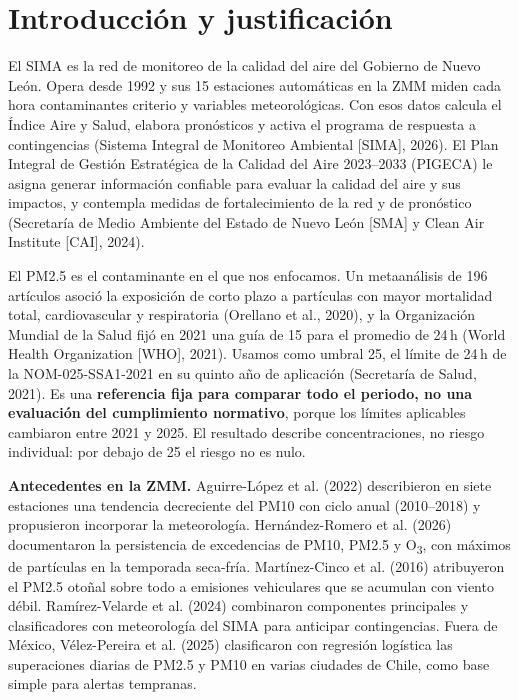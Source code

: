 \section{Introducción y justificación}\label{sec:intro}

El SIMA es la red de monitoreo de la calidad del aire del Gobierno de Nuevo León. Opera desde 1992 y sus 15 estaciones automáticas en la ZMM miden cada hora contaminantes criterio y variables meteorológicas. Con esos datos calcula el Índice Aire y Salud, elabora pronósticos y activa el programa de respuesta a contingencias (Sistema Integral de Monitoreo Ambiental [SIMA], 2026). El Plan Integral de Gestión Estratégica de la Calidad del Aire 2023–2033 (PIGECA) le asigna generar información confiable para evaluar la calidad del aire y sus impactos, y contempla medidas de fortalecimiento de la red y de pronóstico (Secretaría de Medio Ambiente del Estado de Nuevo León [SMA] y Clean Air Institute [CAI], 2024).

El PM2.5 es el contaminante en el que nos enfocamos. Un metaanálisis de 196 artículos asoció la exposición de corto plazo a partículas con mayor mortalidad total, cardiovascular y respiratoria (Orellano et al., 2020), y la Organización Mundial de la Salud fijó en 2021 una guía de 15\ugm{} para el promedio de 24\,h (World Health Organization [WHO], 2021). Usamos como umbral 25\ugm, el límite de 24\,h de la NOM-025-SSA1-2021 en su quinto año de aplicación (Secretaría de Salud, 2021). Es una \textbf{referencia fija para comparar todo el periodo, no una evaluación del cumplimiento normativo}, porque los límites aplicables cambiaron entre 2021 y 2025. El resultado describe concentraciones, no riesgo individual: por debajo de 25\ugm{} el riesgo no es nulo.

\textbf{Antecedentes en la ZMM.} Aguirre-López et al. (2022) describieron en siete estaciones una tendencia decreciente del PM10 con ciclo anual (2010–2018) y propusieron incorporar la meteorología. Hernández-Romero et al. (2026) documentaron la persistencia de excedencias de PM10, PM2.5 y O\textsubscript{3}, con máximos de partículas en la temporada seca-fría. Martínez-Cinco et al. (2016) atribuyeron el PM2.5 otoñal sobre todo a emisiones vehiculares que se acumulan con viento débil. Ramírez-Velarde et al. (2024) combinaron componentes principales y clasificadores con meteorología del SIMA para anticipar contingencias. Fuera de México, Vélez-Pereira et al. (2025) clasificaron con regresión logística las superaciones diarias de PM2.5 y PM10 en varias ciudades de Chile, como base simple para alertas tempranas.

